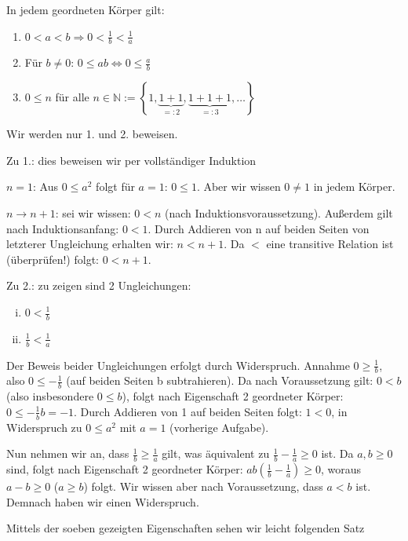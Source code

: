\documentclass[10pt]{scrbook}
\begin{document}
\begin{Sa}
In jedem geordneten Körper gilt:
\begin{enumerate}
	\item $0 < a < b\Rightarrow 0<\frac{1}{b}<\frac{1}{a}$
	\item Für $b\neq 0$: $0 \leq a b\Leftrightarrow 0 \leq \frac{a}{b}$
	\item $0\leq n$ für alle $n\in\mathbb{N}:=\left\{1, \underbrace{1+1}_{=:2}, \underbrace{1+1+1}_{=:3}, \ldots\right\}$
\end{enumerate}
\label{sa:geordnete_koerper}
\end{Sa}
\begin{bew}
Wir werden nur 1. und 2. beweisen.

Zu 1.: dies beweisen wir per vollständiger Induktion

$n=1$: Aus $0\leq a^2$ folgt für $a=1$: $0\leq 1$. Aber wir wissen $0\neq 1$ in jedem Körper.

$n\rightarrow n+1$: sei wir wissen: $0<n$ (nach Induktionsvoraussetzung). Außerdem gilt nach Induktionsanfang: $0<1$. Durch Addieren von n auf beiden Seiten von letzterer Ungleichung erhalten wir: $n<n+1$. Da $<$ eine transitive Relation ist (überprüfen!) folgt: $0<n+1$.

Zu 2.: zu zeigen sind 2 Ungleichungen:
\begin{enumerate}[(i)]
	\item $0<\frac{1}{b}$
	\item $\frac{1}{b}<\frac{1}{a}$
\end{enumerate}

Der Beweis beider Ungleichungen erfolgt durch Widerspruch. Annahme $0\geq\frac{1}{b}$, also $0\leq -\frac{1}{b}$ (auf beiden Seiten b subtrahieren). Da nach Voraussetzung gilt: $0<b$ (also insbesondere $0\leq b$), folgt nach Eigenschaft 2 geordneter Körper: $0\leq -\frac{1}{b} b=-1$. Durch Addieren von 1 auf beiden Seiten folgt: $1<0$, in Widerspruch zu $0\leq a^2$ mit $a=1$ (vorherige Aufgabe).

Nun nehmen wir an, dass $\frac{1}{b}\geq \frac{1}{a}$ gilt, was äquivalent zu $\frac{1}{b}-\frac{1}{a}\geq 0$ ist. Da $a, b\geq 0$ sind, folgt nach Eigenschaft 2 geordneter Körper: $a b \left(\frac{1}{b}-\frac{1}{a}\right)\geq 0$, woraus $a-b\geq 0$ ($a\geq b$) folgt. Wir wissen aber nach Voraussetzung, dass $a<b$ ist. Demnach haben wir einen Widerspruch.
\end{bew}

Mittels der soeben gezeigten Eigenschaften sehen wir leicht folgenden Satz
\end{document}
